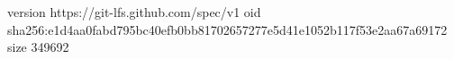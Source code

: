 version https://git-lfs.github.com/spec/v1
oid sha256:e1d4aa0fabd795bc40efb0bb81702657277e5d41e1052b117f53e2aa67a69172
size 349692
